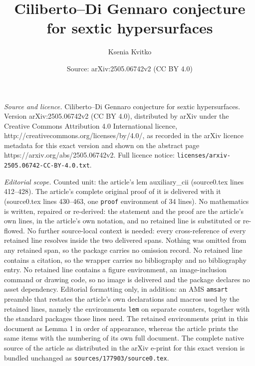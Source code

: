 \documentclass[10pt,a4paper]{amsart}
\title{Ciliberto--Di Gennaro conjecture for sextic hypersurfaces}
\author{Ksenia Kvitko}
\date{Source: arXiv:2505.06742v2 (CC BY 4.0)}
\begin{document}
\maketitle

\noindent\emph{Source and licence.} Ciliberto--Di Gennaro conjecture for sextic hypersurfaces. Version arXiv:2505.06742v2 (CC BY 4.0), distributed by arXiv under the Creative Commons Attribution 4.0 International licence, http://creativecommons.org/licenses/by/4.0/, as recorded in the arXiv licence metadata for this exact version and shown on the abstract page https://arxiv.org/abs/2505.06742v2. Full licence notice: \texttt{licenses/arxiv-2505.06742-CC-BY-4.0.txt}.\par\smallskip

\noindent\textit{Editorial scope.} Counted unit: the article's lem auxiliary\_cii (source0.tex lines 412--428). The article's complete original proof of it is delivered with it (source0.tex lines 430--463, one \texttt{proof} environment of 34 lines). No mathematics is written, repaired or re-derived: the statement and the proof are the article's own lines, in the article's own notation, and no retained line is substituted or re-flowed.  No further source-local context is needed: every cross-reference of every retained line resolves inside the two delivered spans.  Nothing was omitted from any retained span, so the package carries no omission record.  No retained line contains a citation, so the wrapper carries no bibliography and no bibliography entry.  No retained line contains a figure environment, an image-inclusion command or drawing code, so no image is delivered and the package declares no asset dependency.  Editorial formatting only, in addition: an AMS \texttt{amsart} preamble that restates the article's own declarations and macros used by the retained lines, namely the environments \texttt{lem} on separate counters, together with the standard packages those lines need.  The retained environments print in this document as Lemma 1 in order of appearance, whereas the article prints the same items with the numbering of its own full document.  The complete native source of the article as distributed in the arXiv e-print for this exact version is bundled unchanged as \texttt{sources/177903/source0.tex}.
\end{document}
